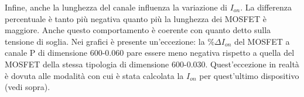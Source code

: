 Infine, anche la lunghezza del canale influenza la variazione di $I_{on}$. La differenza percentuale è tanto più negativa quanto più la lunghezza dei MOSFET è maggiore. Anche questo comportamento è coerente con quanto detto sulla tensione di soglia. Nei grafici è presente un'eccezione: la $\% \Delta I_{on}$ del MOSFET a canale P di dimensione 600-0.060 pare essere meno negativa rispetto a quella del MOSFET della stessa tipologia di dimensione 600-0.030. Quest'eccezione in realtà è dovuta alle modalità con cui è stata calcolata la $I_{on}$ per quest'ultimo dispositivo (vedi sopra).

\FloatBarrier


